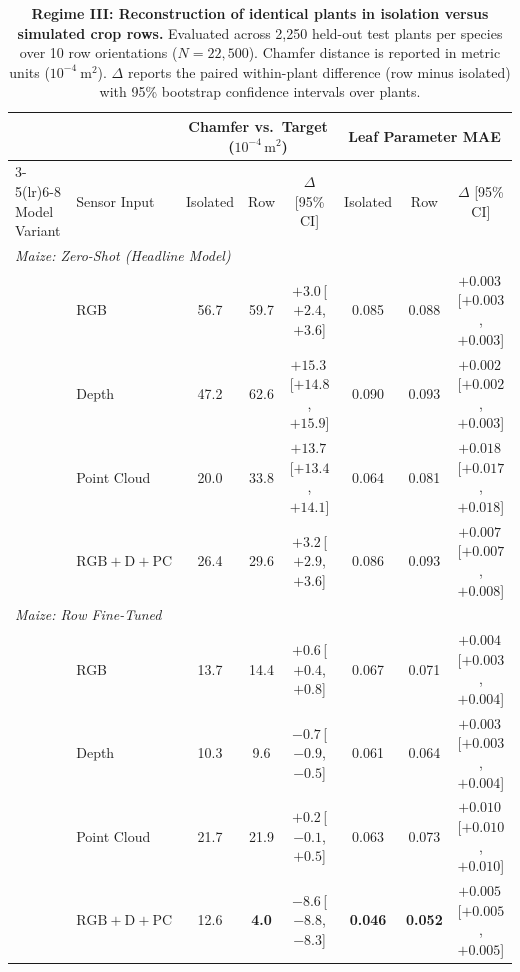 \documentclass[10pt,twocolumn,letterpaper]{article}
\begin{document}
\begin{table}[t]
  \caption{\textbf{Regime III: Reconstruction of identical plants in isolation versus simulated crop rows.} Evaluated across 2{,}250 held-out test plants per species over 10 row orientations ($N = 22{,}500$). Chamfer distance is reported in metric units ($10^{-4}~\mathrm{m}^2$). $\Delta$ reports the paired within-plant difference (row minus isolated) with 95\% bootstrap confidence intervals over plants.}
  \label{tab:rows}\label{tab:regime_3}
  \centering\scriptsize
  \setlength{\tabcolsep}{3.0pt}
  \begin{tabular}{l l ccc ccc}
    \toprule
    & & \multicolumn{3}{c}{Chamfer vs.\ Target ($10^{-4}\,\mathrm{m}^2$)} & \multicolumn{3}{c}{Leaf Parameter MAE} \\
    \cmidrule(lr){3-5}\cmidrule(lr){6-8}
    Model Variant & Sensor Input & Isolated & Row & $\Delta$ [95\% CI] & Isolated & Row & $\Delta$ [95\% CI] \\
    \midrule
    \multicolumn{8}{l}{\emph{Maize: Zero-Shot (Headline Model)}} \\
    & RGB & 56.7 & 59.7 & $+3.0$\,{\tiny[$+2.4$, $+3.6$]} & 0.085 & 0.088 & $+0.003$\,{\tiny[$+0.003$, $+0.003$]} \\
    & Depth & 47.2 & 62.6 & $+15.3$\,{\tiny[$+14.8$, $+15.9$]} & 0.090 & 0.093 & $+0.002$\,{\tiny[$+0.002$, $+0.003$]} \\
    & Point Cloud & 20.0 & 33.8 & $+13.7$\,{\tiny[$+13.4$, $+14.1$]} & 0.064 & 0.081 & $+0.018$\,{\tiny[$+0.017$, $+0.018$]} \\
    & $\mathrm{RGB}+\mathrm{D}+\mathrm{PC}$ & 26.4 & 29.6 & $+3.2$\,{\tiny[$+2.9$, $+3.6$]} & 0.086 & 0.093 & $+0.007$\,{\tiny[$+0.007$, $+0.008$]} \\
    \midrule
    \multicolumn{8}{l}{\emph{Maize: Row Fine-Tuned}} \\
    & RGB & 13.7 & 14.4 & $+0.6$\,{\tiny[$+0.4$, $+0.8$]} & 0.067 & 0.071 & $+0.004$\,{\tiny[$+0.003$, $+0.004$]} \\
    & Depth & 10.3 & 9.6 & $-0.7$\,{\tiny[$-0.9$, $-0.5$]} & 0.061 & 0.064 & $+0.003$\,{\tiny[$+0.003$, $+0.004$]} \\
    & Point Cloud & 21.7 & 21.9 & $+0.2$\,{\tiny[$-0.1$, $+0.5$]} & 0.063 & 0.073 & $+0.010$\,{\tiny[$+0.010$, $+0.010$]} \\
    & $\mathrm{RGB}+\mathrm{D}+\mathrm{PC}$ & 12.6 & \textbf{4.0} & $-8.6$\,{\tiny[$-8.8$, $-8.3$]} & \textbf{0.046} & \textbf{0.052} & $+0.005$\,{\tiny[$+0.005$, $+0.005$]} \\

\end{tabular}
\end{table}
\end{document}
